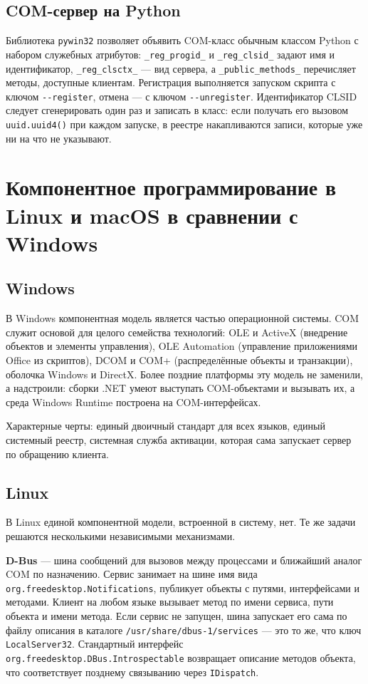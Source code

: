 \documentclass[14pt,a4paper]{extarticle}
\begin{document}
\subsection{COM-сервер на Python}

Библиотека \texttt{pywin32} позволяет объявить COM-класс обычным классом Python с
набором служебных атрибутов: \texttt{\_reg\_progid\_} и \texttt{\_reg\_clsid\_} задают
имя и идентификатор, \texttt{\_reg\_clsctx\_} --- вид сервера, а
\texttt{\_public\_methods\_} перечисляет методы, доступные клиентам. Регистрация
выполняется запуском скрипта с ключом \texttt{-{}-register}, отмена --- с ключом
\texttt{-{}-unregister}. Идентификатор CLSID следует сгенерировать один раз и записать в
класс: если получать его вызовом \texttt{uuid.uuid4()} при каждом запуске, в реестре
накапливаются записи, которые уже ни на что не указывают.

\section{Компонентное программирование в Linux и macOS в сравнении с Windows}

\subsection{Windows}

В Windows компонентная модель является частью операционной системы. COM служит основой
для целого семейства технологий: OLE и ActiveX (внедрение объектов и элементы
управления), OLE Automation (управление приложениями Office из скриптов), DCOM и COM+
(распределённые объекты и транзакции), оболочка Windows и DirectX. Более поздние
платформы эту модель не заменили, а надстроили: сборки .NET умеют выступать
COM-объектами и вызывать их, а среда Windows Runtime построена на COM-интерфейсах.

Характерные черты: единый двоичный стандарт для всех языков, единый системный реестр,
системная служба активации, которая сама запускает сервер по обращению клиента.

\subsection{Linux}

В Linux единой компонентной модели, встроенной в систему, нет. Те же задачи решаются
несколькими независимыми механизмами.

\textbf{D-Bus} --- шина сообщений для вызовов между процессами и ближайший аналог COM
по назначению. Сервис занимает на шине имя вида
\texttt{org.freedesktop.Notifications}, публикует объекты с путями, интерфейсами и
методами. Клиент на любом языке вызывает метод по имени сервиса, пути объекта и имени
метода. Если сервис не запущен, шина запускает его сама по файлу описания в каталоге
\texttt{/usr/share/dbus-1/services} --- это то же, что ключ \texttt{LocalServer32}.
Стандартный интерфейс \texttt{org.freedesktop.DBus.Introspectable} возвращает описание
методов объекта, что соответствует позднему связыванию через \texttt{IDispatch}.
\end{document}
